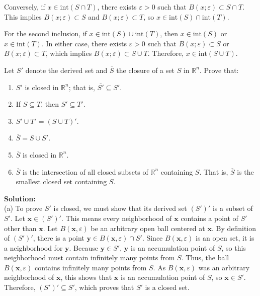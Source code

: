 Conversely, if $x \in \text{int}(S \cap T)$, there exists $\varepsilon > 0$ such that $B(x;\varepsilon) \subset S \cap T$. This implies $B(x;\varepsilon) \subset S$ and $B(x;\varepsilon) \subset T$, so $x \in \text{int}(S) \cap \text{int}(T)$.

For the second inclusion, if $x \in \text{int}(S) \cup \text{int}(T)$, then $x \in \text{int}(S)$ or $x \in \text{int}(T)$. In either case, there exists $\varepsilon > 0$ such that $B(x;\varepsilon) \subset S$ or $B(x;\varepsilon) \subset T$, which implies $B(x;\varepsilon) \subset S \cup T$. Therefore, $x \in \text{int}(S \cup T)$.

\begin{problembox}
Let $S'$ denote the derived set and $\overline{S}$ the closure of a set $S$ in $\mathbb{R}^n$. Prove that:
\begin{enumerate}[label=\alph*)]
\item $S'$ is closed in $\mathbb{R}^n$; that is, $\overline{S'} \subseteq S'$.
\item If $S \subseteq T$, then $S' \subseteq T'$.
\item $S' \cup T' = (S \cup T)'$.
\item $\overline{S} = S \cup S'$.
\item $\overline{S}$ is closed in $\mathbb{R}^n$.
\item $\overline{S}$ is the intersection of all closed subsets of $\mathbb{R}^n$ containing $S$. That is, $\overline{S}$ is the smallest closed set containing $S$.
\end{enumerate}
\end{problembox}
\textbf{Solution:}\\
(a) To prove $S'$ is closed, we must show that its derived set $(S')'$ is a subset of $S'$. Let $\mathbf{x} \in (S')'$. This means every neighborhood of $\mathbf{x}$ contains a point of $S'$ other than $\mathbf{x}$. Let $B(\mathbf{x}, \varepsilon)$ be an arbitrary open ball centered at $\mathbf{x}$. By definition of $(S')'$, there is a point $\mathbf{y} \in B(\mathbf{x}, \varepsilon) \cap S'$. Since $B(\mathbf{x}, \varepsilon)$ is an open set, it is a neighborhood for $\mathbf{y}$. Because $\mathbf{y} \in S'$, $\mathbf{y}$ is an accumulation point of $S$, so this neighborhood must contain infinitely many points from $S$. Thus, the ball $B(\mathbf{x}, \varepsilon)$ contains infinitely many points from $S$. As $B(\mathbf{x}, \varepsilon)$ was an arbitrary neighborhood of $\mathbf{x}$, this shows that $\mathbf{x}$ is an accumulation point of $S$, so $\mathbf{x} \in S'$. Therefore, $(S')' \subseteq S'$, which proves that $S'$ is a closed set.

